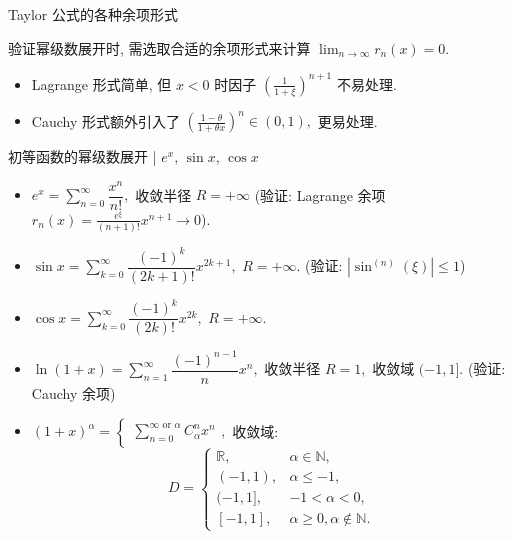 
\begin{frame}{Taylor 公式的各种余项形式}

\begin{remark}
验证幂级数展开时, 需选取合适的余项形式来计算 $\lim_{n\to\infty} r_n(x) = 0.$
\begin{itemize}[<+->]
\item Lagrange 形式简单, 但 $x < 0$ 时因子 $\left(\frac{1}{1+\xi}\right)^{n+1}$ 不易处理.
\item Cauchy 形式额外引入了 $\left(\frac{1-\theta}{1+\theta x}\right)^n \in (0, 1),$ 更易处理.
\end{itemize}
\end{remark}

\end{frame}


\begin{frame}{初等函数的幂级数展开 | $e^x$, $\sin x$, $\cos x$}

\begin{itemize}
\item $e^x = \sum_{n=0}^\infty \dfrac{x^n}{n!},$ 收敛半径 $R = +\infty$ (验证: Lagrange 余项 $r_n(x) = \frac{e^\xi}{(n+1)!} x^{n+1} \to 0$).
\pause
\item $\sin x = \sum_{k=0}^\infty \dfrac{(-1)^k}{(2k+1)!} x^{2k+1},$ $R = +\infty.$ (验证: $|\sin^{(n)}(\xi)| \leqslant 1$)
\pause
\item $\cos x = \sum_{k=0}^\infty \dfrac{(-1)^k}{(2k)!} x^{2k},$ $R = +\infty.$
\end{itemize}

\pause

\begin{itemize}[<+->]
\item $\ln(1+x) = \sum_{n=1}^\infty \dfrac{(-1)^{n-1}}{n} x^n,$ 收敛半径 $R = 1,$ 收敛域 $(-1, 1].$ (验证: Cauchy 余项)
\item $(1+x)^\alpha = \begin{cases} \sum_{n=0}^{\infty \text{ or } \alpha} C_\alpha^n x^n \end{cases},$ 收敛域:
\[D = \begin{cases}
\mathbb{R}, & \alpha \in \mathbb{N}, \\
(-1, 1), & \alpha \leqslant -1, \\
(-1, 1], & -1 < \alpha < 0, \\
[-1, 1], & \alpha \geqslant 0, \alpha \notin \mathbb{N}.
\end{cases}\]
\end{itemize}

\end{frame}


